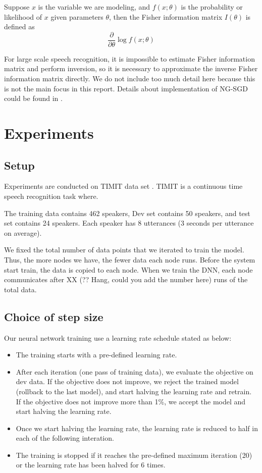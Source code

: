 \documentclass{article}
\begin{document}
Suppose $x$ is the variable we are modeling, and $f(x;\theta)$ is the probability or likelihood of $x$ given parameters $\theta$, then the
Fisher information matrix $I(\theta)$ is defined as
\begin{equation}
\frac{\partial}{\partial\theta}\log f(x;\theta)
\end{equation}

For large scale speech recognition, it is impossible to estimate Fisher information matrix and perform inversion, so it is necessary to 
approximate the inverse Fisher information matrix directly. We do not include too much detail here because this is not the main focus 
in this report. Details about implementation of NG-SGD could be found in \cite{povey2014parallel}.

\section{Experiments}
\subsection{Setup}
Experiments are conducted on TIMIT data set \cite{timit}. TIMIT is a continuous time speech recognition task where.

The training data contains 462 speakers, Dev set contains 50 speakers, and test set contains 24 speakers. Each
speaker has 8 utterances (3 seconds per utterance on average).

We fixed the total number of data points that we iterated to train the model. Thus, the more nodes we have, the fewer data each node runs. Before the system start train, the data is copied to each node. When we train the DNN, each node communicates after XX (?? Hang, could you add the number here) runs of the total data.  
\subsection{Choice of step size}
Our neural network training use a learning rate schedule stated as below:
\begin{itemize}
\item The training starts with a pre-defined learning rate.
\item After each iteration (one pass of training data), we evaluate the objective on dev data. If the 
objective does not improve, we reject the trained model (rollback to the last model), and start halving 
the learning rate and retrain. If the objective does not improve more than 1\%, we accept the model 
and start halving the learning rate.
\item Once we start halving the learning rate, the learning rate is reduced to half in each of the 
following interation.
\item The training is stopped if it reaches the pre-defined maximum iteration (20) or the learning rate
has been halved for 6 times.
\end{itemize}
\end{document}
